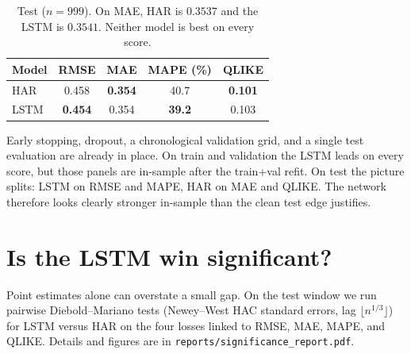 \documentclass[12pt]{article}
\begin{document}
\begin{table}[H]
\centering
\begin{tabular}{lcccc}
\toprule
Model & RMSE & MAE & MAPE (\%) & QLIKE \\
\midrule
HAR & 0.458 & \textbf{0.354} & 40.7 & \textbf{0.101} \\
LSTM & \textbf{0.454} & 0.354 & \textbf{39.2} & 0.103 \\
\bottomrule
\end{tabular}
\caption{Test (\(n=999\)). On MAE, HAR is \(0.3537\) and the LSTM is \(0.3541\).
Neither model is best on every score.}
\end{table}
\begin{explain}
Early stopping, dropout, a chronological validation grid, and a single test evaluation are already in place.
On train and validation the LSTM leads on every score, but those panels are in-sample after the train+val refit.
On test the picture splits: LSTM on RMSE and MAPE, HAR on MAE and QLIKE.
The network therefore looks clearly stronger in-sample than the clean test edge justifies.
\end{explain}

\section{Is the LSTM win significant?}
Point estimates alone can overstate a small gap. On the test window we run pairwise Diebold--Mariano tests
(Newey--West HAC standard errors, lag \(\lfloor n^{1/3}\rfloor\)) for LSTM versus HAR on the four losses
linked to RMSE, MAE, MAPE, and QLIKE. Details and figures are in \texttt{reports/significance\_report.pdf}.
\end{document}
